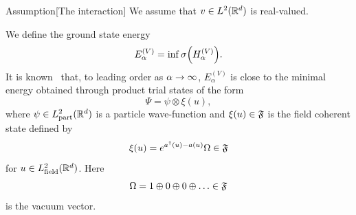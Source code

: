 \documentclass[AHL,Unicode,longabstracts,published]{cedram}
\DeclareMathOperator{\partt}{part}
\DeclareMathOperator{\field}{field}
\newcommand{\R}{\mathbb{R}}
\newcommand{\gF}{\mathfrak{F}}
\newcommand{\1}{\mathds{1}}
\let\oldin\in
\renewcommand{\in}{\mathchoice{\oldin}{\oldin}{\,\oldin\,}{\,\oldin\,}}
\renewcommand*{\to}{\mathchoice{\longrightarrow}{\rightarrow}{\rightarrow}{\rightarrow}}
\let\originalleft\left
\let\originalright\right
\renewcommand{\left}{\mathopen{}\mathclose\bgroup\originalleft}
\renewcommand{\right}{\aftergroup\egroup\originalright}
\begin{document}
\begin{enonce}{Assumption}[{The interaction}]\label{assum:int}
We assume that $v\in L^2(\R^d)$ is real-valued.
\end{enonce}


We define the ground state energy
\begin{equation}
E^{(V)}_\alpha=\inf \sigma\left(H^{(V)}_\alpha\right).
\end{equation}
It is known~\cite{DonVar-83,LieTho-97,MiySpo-07} that, to leading order as $\alpha\to\infty$, $E^{(V)}_\alpha$ is close to the minimal energy obtained through product trial states of the form
\begin{equation*}
\Psi=\psi\otimes \xi(u),
\end{equation*}
where $\psi\in L^2_{\partt}(\R^d)$ is a particle wave-function and $\xi(u)\in \gF$ is the field coherent state defined by
\begin{equation}\label{eq:coherent_state}
\xi(u)=e^{a^\dagger(u)-a(u)}\Omega \in \gF
\end{equation}
for $u\in L^2_{\field}(\R^d)$. Here
\begin{equation*}
\Omega=1\oplus0\oplus0\oplus\dots\in\gF
\end{equation*}
is the vacuum vector.
\end{document}
